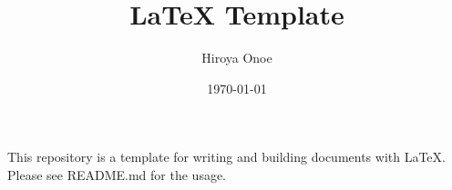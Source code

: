 \documentclass[a4paper,11pt,uplatex,dvipdfmx]{article}
\begin{document}
\title{LaTeX Template}
\author{Hiroya Onoe}
\date{\today}
\maketitle

This repository is a template for writing and building documents with LaTeX. Please see README.md\cite{latex-template} for the usage.



\end{document}
